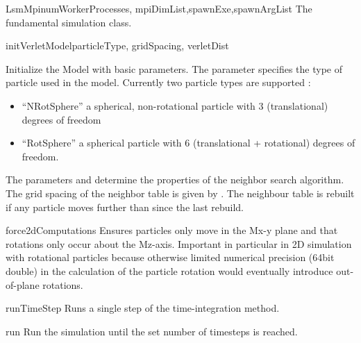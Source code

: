 \documentclass{manual}
\begin{document}
\begin{classdesc}{LsmMpi}{numWorkerProcesses, mpiDimList,spawnExe,spawnArgList}
The fundamental simulation class. 

\begin{methoddesc}{initVerletModel}{particleType, gridSpacing, verletDist}

Initialize the Model with basic parameters. The parameter  specifies the type of particle used in the model. Currently two particle types are supported :
\begin{itemize}
\item ``NRotSphere'' a spherical, non-rotational particle with 3 (translational) degrees of freedom
\item ``RotSphere'' a spherical particle with 6 (translational + rotational) degrees of freedom.
\end{itemize}   
The parameters  and  determine the properties of the neighbor search algorithm. The grid spacing of the neighbor table is given by . The neighbour table is rebuilt if any particle moves further than   since the last rebuild. 

\end{methoddesc}

\begin{methoddesc}{force2dComputations}{}
Ensures particles only move in the M{x-y} plane and that rotations only occur about the M{z}-axis. Important in particular in 2D simulation with rotational particles because otherwise limited numerical precision (64bit double) in the calculation of the particle rotation would eventually introduce out-of-plane rotations.
\end{methoddesc}

\begin{methoddesc}{runTimeStep}{}
Runs a single step of the time-integration method.
\end{methoddesc}

\begin{methoddesc}{run}{}
Run the simulation until the set number of timesteps is reached. 
\end{methoddesc}


\end{classdesc}
\end{document}
